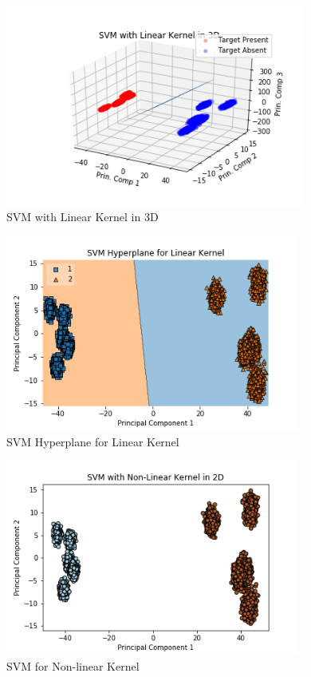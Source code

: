 \documentclass[journal,12pt,twocolumn]{IEEEtran}
\begin{document}
\begin{figure}[!h]
\begin{center}
\includegraphics[width=3.9in]{figs/LinSVM_3D.png}
\end{center}
\caption{SVM with Linear Kernel in 3D}
\label{fig: 3D Plot}
\end{figure}

\begin{figure}[!h]
\begin{center}
\includegraphics[width=3.8in]{figs/HyperPlane_Lin.png}
\end{center}
\caption{SVM Hyperplane for Linear Kernel}
\label{fig: 3D Plot}
\end{figure}

\begin{figure}[!h]
\begin{center}
\includegraphics[width=3.8in]{figs/NLinSVM_2D.png}
\end{center}
\caption{SVM for Non-linear Kernel}
\label{fig: 3D Plot}
\end{figure}
\end{document}
